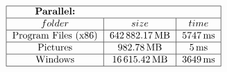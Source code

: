 \documentclass{article}
\begin{document}
    \begin{doublespacing}
      \begin{align*}
        \begin{tabular}{|*{3}{c|}}
          \hline
          \multicolumn{1}{|c}{\bfseries Parallel:} & \multicolumn{1}{c}{} & \multicolumn{1}{c|}{} \\
          \hline
          $folder$ & $size$ & $time$ \\
          \hline
          Program Files (x86) & $\SI{642882.17}{\mega\byte}$ & $\SI{5747}{\milli\second}$ \\
          \hline
          Pictures & $\SI{982.78}{\mega\byte}$ & $\SI{5}{\milli\second}$ \\
          \hline
          Windows & $\SI{16615.42}{\mega\byte}$ & $\SI{3649}{\milli\second}$ \\
          \hline
        \end{tabular}
      \end{align*}
    \end{doublespacing}
\end{document}
